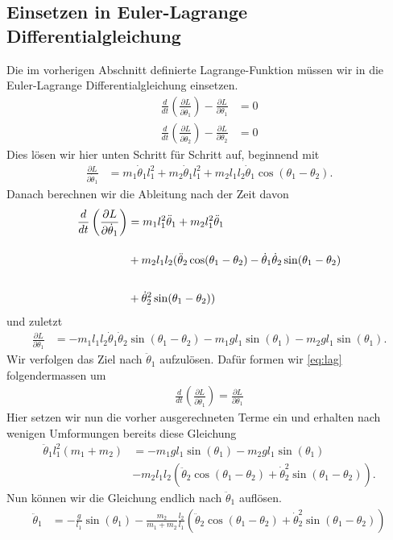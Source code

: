 \subsection{Einsetzen in Euler-Lagrange Differentialgleichung}
Die im vorherigen Abschnitt definierte Lagrange-Funktion müssen wir in
die Euler-Lagrange Differentialgleichung einsetzen.
\begin{align}
    \label{eq:lag}
    \frac{d}{dt} \left(\frac{\partial L}{\partial \dot{\theta}_1}\right) 
    - \frac{\partial L}{\partial \theta_1} &= 0 \\
    \frac{d}{dt} \left(\frac{\partial L}{\partial \dot{\theta}_2}\right) 
    - \frac{\partial L}{\partial \theta_2} &= 0
\end{align}
Dies lösen wir hier unten Schritt für Schritt auf, beginnend mit
\begin{align}
    \frac{\partial L}{\partial \dot{\theta}_1} &= m_1 \dot{\theta}_1 l_1^2
    + m_2 \dot{\theta}_1 l_1^2 + m_2 l_1 l_2 \dot{\theta}_1
    \cos(\theta_1-\theta_2).
\end{align}
Danach berechnen wir die Ableitung nach der Zeit davon
\begin{align}
    \frac{d}{dt} \left(\frac{\partial L}{\partial \dot{\theta}_1}\right) &=
    m_1 l_1^2 \ddot{\theta}_1 + m_2 l_1^2 \ddot{\theta}_1 \\
    \shortintertext{}
    &+ m_2 l_1 l_2 (\ddot{\theta}_2\cos(\theta_1-\theta_2)-
    \dot{\theta}_1 \dot{\theta}_2 \sin(\theta_1-\theta_2) \nonumber \\
    \shortintertext{}
    &+ \dot{\theta}_2^2 \sin(\theta_1-\theta_2))
    \nonumber
\end{align}
und zuletzt
\begin{align}
    \frac{\partial L}{\partial {\theta}_1} &= -m_1 l_1 l_2 \dot{\theta}_1
    \dot{\theta}_2 \sin(\theta_1-\theta_2) - m_1 g l_1 \sin(\theta_1)
    - m_2 g l_1 \sin(\theta_1).
\end{align}
Wir verfolgen das Ziel nach \(\ddot{\theta}_1\) aufzulösen.
Dafür formen wir \eqref{eq:lag} folgendermassen um
\begin{align}
    \frac{d}{dt} \left(\frac{\partial L}{\partial \dot{\theta}_1}\right) 
    = \frac{\partial L}{\partial \theta_1}
\end{align}
Hier setzen wir nun die vorher ausgerechneten Terme ein und erhalten nach wenigen
Umformungen bereits diese Gleichung
\begin{align}
    \ddot{\theta}_1 l_1^2 (m_1 + m_2) &= -m_1 g l_1 \sin(\theta_1) - m_2 g l_1 \sin(\theta_1) \\
    &- m_2 l_1 l_2 \left(\ddot{\theta}_2 \cos(\theta_1-\theta_2) 
    + \dot{\theta}_2^2 \sin(\theta_1-\theta_2) \right).
\end{align}
Nun können wir die Gleichung endlich nach \(\ddot{\theta}_1\) auflösen.
\begin{align}
    \ddot{\theta}_1 &= -\frac{g}{l_1} \sin(\theta_1) - \frac{m_2}{m_1+m_2} \frac{l_2}{l_1} 
    \left(\ddot{\theta}_2 \cos(\theta_1-\theta_2) + \dot{\theta}_2^2 \sin(\theta_1-\theta_2) \right)
\end{align}

